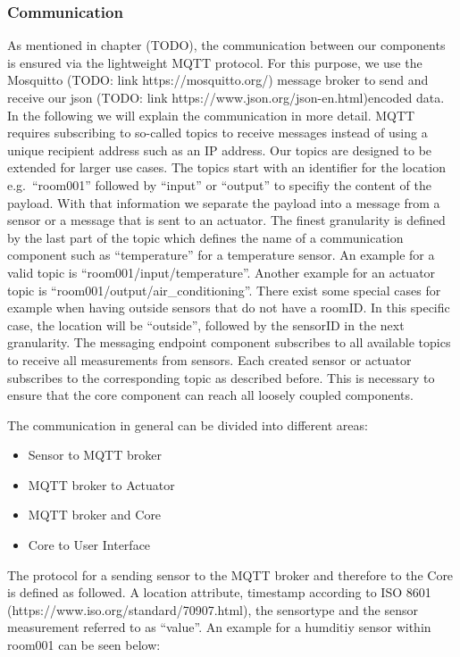 \subsubsection{Communication}\label{subsubsec:communication}

As mentioned in chapter (TODO), the communication between our components
is ensured via the lightweight MQTT protocol.
For this purpose, we use the Mosquitto (TODO: link https://mosquitto.org/) message broker to send and receive our json (TODO: link https://www.json.org/json-en.html)encoded data.
In the following we will explain the communication in more
detail.
MQTT requires subscribing to so-called topics to receive messages instead of using a unique recipient address such as an IP address.
Our topics are designed to be extended for larger use cases.
The topics start with an identifier for the location e.g.~``room001'' followed by ``input'' or ``output'' to specifiy the content of the payload.
With that information we separate the payload into a message from a sensor or a message that is sent to an actuator.
The finest granularity is defined by the last part of the topic which defines the
name of a communication component such as ``temperature'' for a
temperature sensor.
An example for a valid topic is
``room001/input/temperature''.
Another example for an actuator topic is
``room001/output/air\_conditioning''.
There exist some special cases for
example when having outside sensors that do not have a roomID. In this specific case, the location will be ``outside'', followed by the sensorID in the next granularity.
The messaging endpoint component subscribes to all available topics to receive all measurements from sensors.
Each created sensor or actuator subscribes to the corresponding topic as described before.
This is necessary to ensure that the core component can reach all loosely coupled components.

The communication in general can be divided into different areas:
\begin{itemize}
    \item Sensor to MQTT broker
    \item MQTT broker to Actuator
    \item MQTT broker and Core
    \item Core to User Interface
\end{itemize}


The protocol for a sending sensor to the MQTT broker and therefore to
the Core is defined as followed.
A location attribute, timestamp
according to ISO 8601 (https://www.iso.org/standard/70907.html), the
sensortype and the sensor measurement referred to as ``value''.
An
example for a humditiy sensor within room001 can be seen below:

